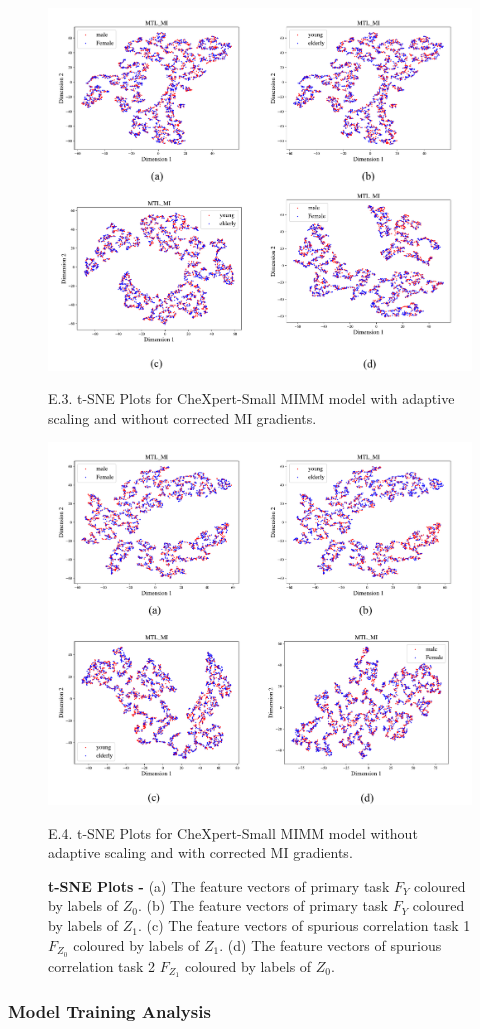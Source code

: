 \documentclass[12pt,DIV14,BCOR12mm,a4paper,footinclude=false,headinclude,parskip=half-,twoside,openright,cleardoublepage=empty,toc=index,bibliography=totoc,listof=totoc]{scrreprt}
\numberwithin{equation}{chapter}
\begin{document}
\begin{figure}[H]
\centering
\includegraphics[width=0.7\linewidth]{thesis/figures/tsne_chx_ada_nocorr.pdf}
\caption{E.3. t-SNE Plots for CheXpert-Small MIMM model with adaptive scaling and without corrected MI gradients.}
\includegraphics[width=0.7\linewidth]
{thesis/figures/tsne_chx_noada_corr.pdf}
\caption{E.4. t-SNE Plots for CheXpert-Small MIMM model without adaptive scaling and with corrected MI gradients.}
\caption*{\textbf{t-SNE Plots - }(a) The feature vectors of primary task $F_Y$ coloured by labels of $Z_0$. (b) The feature vectors of primary task $F_Y$ coloured by labels of $Z_1$. (c) The feature vectors of spurious correlation task 1 $F_{Z_0}$ coloured by labels of $Z_1$. (d) The feature vectors of spurious correlation task 2 $F_{Z_1}$ coloured by labels of $Z_0$.}
\end{figure}

\subsubsection{Model Training Analysis}
\end{document}
